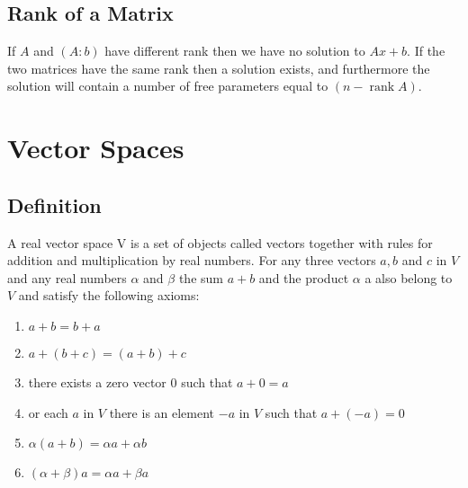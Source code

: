 \documentclass[12pt,a4paper,fleqn]{mycalc}
\begin{document}
	\subsection{Rank of a Matrix}
	\begin{tcolorbox}
		If $ A $ and $ (A : b) $ have different rank then we have no solution to $ Ax+b. $ If the two matrices have the same rank then a solution exists, and furthermore the solution will contain a number of free parameters equal to $ (n - \operatorname{rank} A). $
	\end{tcolorbox}
	\section{Vector Spaces}
	\subsection{Definition}
	A real vector space V is a set of objects called vectors together with rules for addition and multiplication by real numbers. For any three vectors $ a, b $ and $ c $ in $ V $ and any real numbers $\alpha$ and $\beta$ the sum $ a + b $ and the product $\alpha$ a also belong to $ V $ and satisfy the following axioms:
	\begin{enumerate}[a]
		\item $ a+b=b+a $
		\item $ a+(b+c)=(a+b)+c $
		\item there exists a zero vector 0 such that $ a+0=a $
		\item or each $ a $ in $ V $ there is an element $ -a $ in $ V $ such that $ a+(-a)=0 $
		\item $ \alpha (a + b) = \alpha a + \alpha b $
		\item $ (\alpha + \beta)a = \alpha a + \beta a $
	\end{enumerate}
\end{document}
